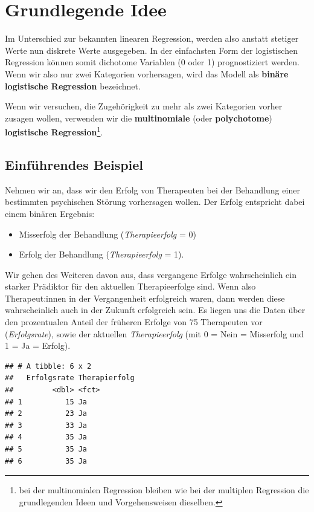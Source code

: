 \documentclass[
]{article}
\providecommand{\tightlist}{%
  \setlength{\itemsep}{0pt}\setlength{\parskip}{0pt}}
\begin{document}
\section*{Grundlegende Idee}\label{grundlegende-idee}

Im Unterschied zur bekannten linearen Regression, werden also anstatt stetiger Werte nun diskrete Werte ausgegeben. In der einfachsten Form der logistischen Regression können somit dichotome Variablen (0 oder 1) prognostiziert werden. Wenn wir also nur zwei Kategorien vorhersagen, wird das Modell als \textbf{binäre logistische Regression} bezeichnet.

Wenn wir versuchen, die Zugehörigkeit zu mehr als zwei Kategorien vorher zusagen wollen, verwenden wir die \textbf{multinomiale} (oder \textbf{polychotome}) \textbf{logistische Regression}\footnote{bei der multinomialen Regression bleiben wie bei der multiplen Regression die grundlegenden Ideen und Vorgehensweisen dieselben.}.

\subsection{Einführendes Beispiel}\label{einfuxfchrendes-beispiel}

Nehmen wir an, dass wir den Erfolg von Therapeuten bei der Behandlung einer bestimmten psychischen Störung vorhersagen wollen. Der Erfolg entspricht dabei einem binären Ergebnis:

\begin{itemize}
\tightlist
\item
  Misserfolg der Behandlung (\emph{Therapieerfolg} = 0)
\item
  Erfolg der Behandlung (\emph{Therapieerfolg} = 1).
\end{itemize}

Wir gehen des Weiteren davon aus, dass vergangene Erfolge wahrscheinlich ein starker Prädiktor für den aktuellen Therapieerfolge sind. Wenn also Therapeut:innen in der Vergangenheit erfolgreich waren, dann werden diese wahrscheinlich auch in der Zukunft erfolgreich sein. Es liegen uns die Daten über den prozentualen Anteil der früheren Erfolge von 75 Therapeuten vor (\emph{Erfolgsrate}), sowie der aktuellen \emph{Therapieerfolg} (mit 0 = Nein = Misserfolg und 1 = Ja = Erfolg).

\begin{verbatim}
## # A tibble: 6 x 2
##   Erfolgsrate Therapierfolg
##         <dbl> <fct>        
## 1          15 Ja           
## 2          23 Ja           
## 3          33 Ja           
## 4          35 Ja           
## 5          35 Ja           
## 6          35 Ja
\end{verbatim}
\end{document}
